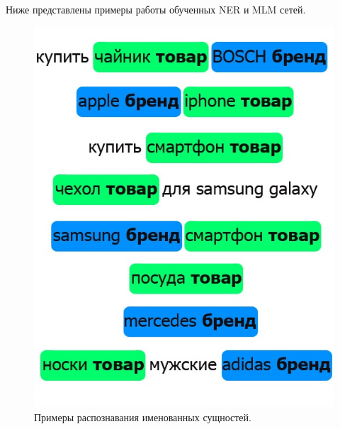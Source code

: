 \documentclass[12pt,a4paper]{article}
\begin{document}
\begin{table}[H]
    \begin{center}
    \caption{Матрица ошибок для NER на валидационной выборке}
    \end{center}
\end{table}

\noindent Ниже представлены примеры работы обученных NER и MLM сетей.

\begin{figure}[H]
	\begin{center}
		\includegraphics[scale=0.5]{ner2.jpg}
	\end{center}
	\caption{Примеры распознавания именованных сущностей.}
\end{figure}
\end{document}
